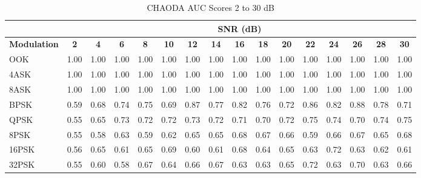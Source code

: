 \documentclass[conference]{IEEEtran}
\begin{document}
\begin{table}[H]
\centering
\caption{CHAODA AUC Scores 2 to 30 dB}
\begin{tabular}{|l|l|l|l|l|l|l|l|l|l|l|l|l|l|l|l|} 
\hline
     & \multicolumn{15}{c|}{\textbf{SNR (dB)}}                                                                                                                                                                                                                                                                                                                                                                                                                                                                    \\
\hline
\multicolumn{1}{|c|}{\textbf{Modulation}} & \multicolumn{1}{c|}{\textbf{2}} & \multicolumn{1}{c|}{\textbf{4}} & \multicolumn{1}{c|}{\textbf{6}} & \multicolumn{1}{c|}{\textbf{8}} & \multicolumn{1}{c|}{\textbf{10}} & \multicolumn{1}{c|}{\textbf{12}} & \multicolumn{1}{c|}{\textbf{14}} & \multicolumn{1}{c|}{\textbf{16}} & \multicolumn{1}{c|}{\textbf{18}} & \multicolumn{1}{c|}{\textbf{20}} & \multicolumn{1}{c|}{\textbf{22}} & \multicolumn{1}{c|}{\textbf{24}} & \multicolumn{1}{c|}{\textbf{26}} & \multicolumn{1}{c|}{\textbf{28}} & \multicolumn{1}{c|}{\textbf{30}}  \\ 
\hline OOK  & 1.00 & 1.00 & 1.00 & 1.00 & 1.00 & 1.00 & 1.00 & 1.00 & 1.00 & 1.00 & 1.00 & 1.00 & 1.00 & 1.00 & 1.00 \\
\hline 4ASK & 1.00 & 1.00 & 1.00 & 1.00 & 1.00 & 1.00 & 1.00 & 1.00 & 1.00 & 1.00 & 1.00 & 1.00 & 1.00 & 1.00 & 1.00 \\
\hline 8ASK & 1.00 & 1.00 & 1.00 & 1.00 & 1.00 & 1.00 & 1.00 & 1.00 & 1.00 & 1.00 & 1.00 & 1.00 & 1.00 & 1.00 & 1.00 \\
\hline BPSK & 0.59 & 0.68 & 0.74 & 0.75 & 0.69 & 0.87 & 0.77 & 0.82 & 0.76 & 0.72 & 0.86 & 0.82 & 0.88 & 0.78 & 0.71 \\
\hline QPSK & 0.55 & 0.65 & 0.73 & 0.72 & 0.72 & 0.73 & 0.72 & 0.71 & 0.70 & 0.72 & 0.75 & 0.74 & 0.70 & 0.74 & 0.75 \\
\hline 8PSK & 0.55 & 0.58 & 0.63 & 0.59 & 0.62 & 0.65 & 0.65 & 0.68 & 0.67 & 0.66 & 0.59 & 0.66 & 0.67 & 0.65 & 0.68 \\
\hline 16PSK & 0.56 & 0.65 & 0.61 & 0.65 & 0.69 & 0.60 & 0.61 & 0.68 & 0.64 & 0.65 & 0.63 & 0.72 & 0.63 & 0.62 & 0.61 \\
\hline 32PSK & 0.55 & 0.60 & 0.58 & 0.67 & 0.64 & 0.66 & 0.67 & 0.63 & 0.63 & 0.65 & 0.72 & 0.63 & 0.70 & 0.63 & 0.66 \\

\end{tabular}
\end{table}
\end{document}
